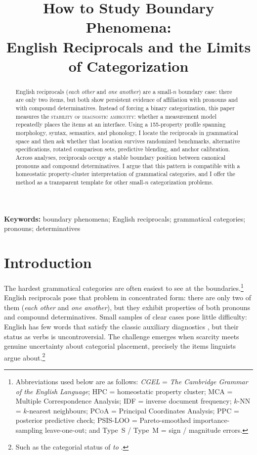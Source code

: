 \documentclass[12pt]{article}
\title{How to Study Boundary Phenomena:\\English Reciprocals and the Limits of Categorization}
\author{}
\date{}
\providecommand{\term}[1]{\textsc{#1}}
\providecommand{\mention}[1]{\textit{#1}}
\providecommand{\abbr}[1]{\textsc{#1}}
\begin{document}
\maketitle

\begin{abstract}
\noindent 
English reciprocals (\mention{each other} and \mention{one another}) are a small-$n$ boundary case: there are only two items, but both show persistent evidence of affiliation with pronouns and with compound determinatives. Instead of forcing a binary categorization, this paper measures the \term{stability of diagnostic ambiguity}: whether a measurement model repeatedly places the items at an interface. Using a 155-property profile spanning morphology, syntax, semantics, and phonology, I locate the reciprocals in grammatical space and then ask whether that location survives randomized benchmarks, alternative specifications, rotated comparison sets, predictive blending, and anchor calibration. Across analyses, reciprocals occupy a stable boundary position between canonical pronouns and compound determinatives. I argue that this pattern is compatible with a homeostatic property-cluster interpretation of grammatical categories, and I offer the method as a transparent template for other small-$n$ categorization problems.
\end{abstract}
\noindent\textbf{Keywords:} boundary phenomena; English reciprocals; grammatical categories; pronouns; determinatives

\section{Introduction}

The hardest grammatical categories are often easiest to see at the boundaries.\footnote{Abbreviations used below are as follows: \textit{CGEL} = \textit{The Cambridge Grammar of the English Language}; \abbr{HPC} = homeostatic property cluster; \abbr{MCA} = Multiple Correspondence Analysis; \abbr{IDF} = inverse document frequency; $k$-\abbr{NN} = $k$-nearest neighbours; \abbr{PCoA} = Principal Coordinates Analysis; \abbr{PPC} = posterior predictive check; \abbr{PSIS-LOO} = Pareto-smoothed importance-sampling leave-one-out; and Type~S / Type~M = sign / magnitude errors.} English reciprocals pose that problem in concentrated form: there are only two of them (\mention{each other} and \mention{one another}), but they exhibit properties of both pronouns and compound determinatives. Small samples of clear cases pose little difficulty: English has few words that satisfy the classic auxiliary diagnostics \parencite{sag2020lessons}, but their status as verbs is uncontroversial. The challenge emerges when scarcity meets genuine uncertainty about categorial placement, precisely the items linguists argue about.\footnote{Such as the categorial status of \mention{to} \parencite{levine2012toscompany}.}
\end{document}
